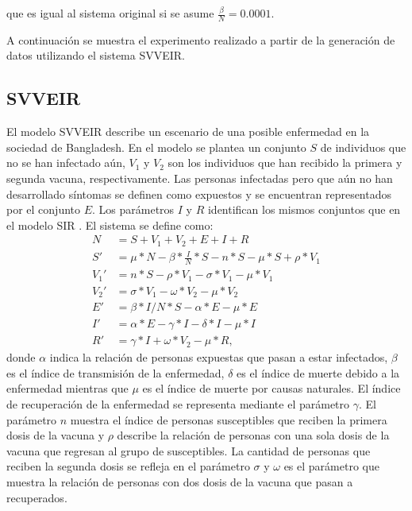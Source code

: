 que es igual al sistema original si se asume $\frac{\beta}{N} = 0.0001$.

A continuación se muestra el experimento realizado a partir de la generación de datos utilizando el sistema SVVEIR.

\subsection{SVVEIR}

El modelo SVVEIR describe un escenario de una posible enfermedad en la sociedad de Bangladesh. En el modelo se plantea un conjunto $S$ de individuos que no se han infectado aún, $V_1$ y $V_2$ son los individuos que han recibido la primera y segunda vacuna, respectivamente. Las personas infectadas pero que aún no han desarrollado síntomas se definen como expuestos y se encuentran representados por el conjunto $E$. Los parámetros $I$ y $R$ identifican los mismos conjuntos que en el modelo SIR \cite{kuddus2021mathematical}. El sistema se define como:
\begin{align*}
    N    & = S + V_1 + V_2 + E + I + R                                        \\
    S'   & = \mu * N - \beta * \frac{I}{N} * S - n * S - \mu * S + \rho * V_1 \\
    V_1' & = n * S - \rho * V_1 - \sigma * V_1 - \mu * V_1                    \\
    V_2' & = \sigma * V_1 - \omega * V_2 - \mu * V_2                          \\
    E'   & = \beta * I / N * S - \alpha * E - \mu * E                         \\
    I'   & = \alpha * E - \gamma * I - \delta * I - \mu * I                   \\
    R'   & = \gamma * I + \omega * V_2 - \mu * R,
\end{align*}
donde $\alpha$ indica la relación de personas expuestas que pasan a estar infectados, $\beta$ es el índice de transmisión de la enfermedad, $\delta$ es el índice de muerte debido a la enfermedad mientras que $\mu$ es el índice de muerte por causas naturales. El índice de recuperación de la enfermedad se representa mediante el parámetro $\gamma$. El parámetro $n$ muestra el índice de personas susceptibles que reciben la primera dosis de la vacuna y $\rho$ describe la relación de personas con una sola dosis de la vacuna que regresan al grupo de susceptibles. La cantidad de personas que reciben la segunda dosis se refleja en el parámetro $\sigma$ y $\omega$ es el parámetro que muestra la relación de personas con dos dosis de la vacuna que pasan a recuperados.

